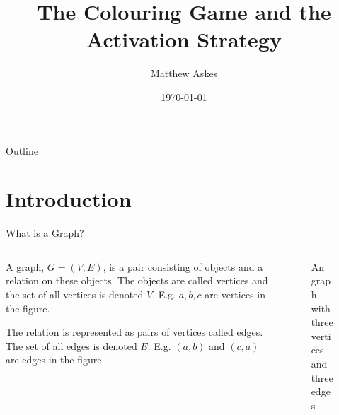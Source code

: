 \documentclass{beamer}
\title[The Colouring Game and the Activ. Strat.]{The Colouring Game and the Activation Strategy}
\author{Matthew Askes}
\institute[Victoria University]{Victoria University of Wellington}
\date{\today}
\begin{document}
\frame{\titlepage}


\begin{frame}{Outline}
    \tableofcontents
\end{frame}

\section{Introduction}


\begin{frame}{\secname}{What is a Graph?}
      
    \begin{columns}
        \begin{column}{0.7\textwidth}
             A graph, $G=(V,E)$, is a pair consisting of objects and a relation on these objects. The objects are called vertices and the set of all vertices is denoted $V$. E.g. $a,b,c$ are vertices in the figure.
             
            \bigskip
            
            The relation is represented as pairs of vertices called edges. The set of all edges is denoted $E$. E.g. $(a,b)$ and $(c,a)$ are edges in the figure.
        \end{column}
        \begin{column}{0.3\textwidth}  
            \begin{center}
                \begin{figure}[h]
                    \centering
                    \caption{An graph with three vertices and three edges}
                    \label{fig:k3}
                \end{figure}
            \end{center}
        \end{column}
    \end{columns}
    
\end{frame}
\end{document}
